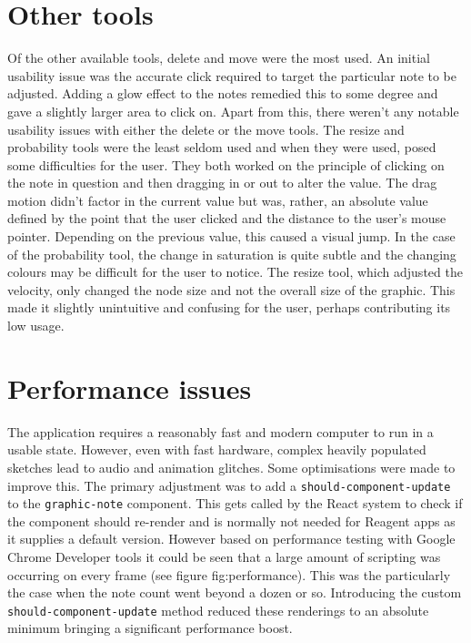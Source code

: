 \documentclass[12pt]{report}
\begin{document}
\section{Other tools}
\label{sec:orgcfb4409}
Of the other available tools, delete and move were the most used. An initial
usability issue was the accurate click required to target the particular note to
be adjusted. Adding a glow effect to the notes remedied this to some degree and
gave a slightly larger area to click on. Apart from this, there weren't any
notable usability issues with either the delete or the move tools. The resize
and probability tools were the least seldom used and when they were used, posed
some difficulties for the user. They both worked on the principle of clicking on
the note in question and then dragging in or out to alter the value. The drag
motion didn't factor in the current value but was, rather, an absolute value
defined by the point that the user clicked and the distance to the user's mouse
pointer. Depending on the previous value, this caused a visual jump. In the case
of the probability tool, the change in saturation is quite subtle and the
changing colours may be difficult for the user to notice. The resize tool, which
adjusted the velocity, only changed the node size and not the overall size of
the graphic. This made it slightly unintuitive and confusing for the user,
perhaps contributing its low usage.

\section{Performance issues}
\label{sec:org0bf4b0f}
The application requires a reasonably fast and modern computer to run in a
usable state. However, even with fast hardware, complex heavily populated
sketches lead to audio and animation glitches. Some optimisations were made to
improve this. The primary adjustment was to add a \texttt{should-component-update} to
the \texttt{graphic-note} component. This gets called by the React system to check if
the component should re-render and is normally not needed for Reagent apps as it
supplies a default version. However based on performance testing with Google
Chrome Developer tools it could be seen that a large amount of scripting was
occurring on every frame (see figure fig:performance). This was the particularly
the case when the note count went beyond a dozen or so. Introducing the custom
\texttt{should-component-update} method reduced these renderings to an absolute minimum
bringing a significant performance boost.
\end{document}

